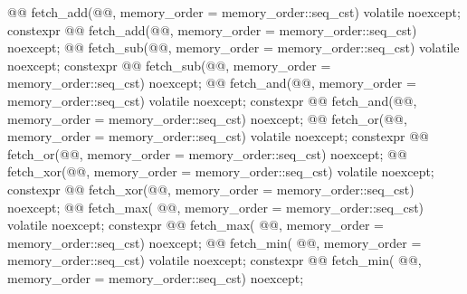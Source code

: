 \begin{codeblock}
{{    @@ fetch_add(@@,
                            memory_order = memory_order::seq_cst) volatile noexcept;
    constexpr @@ fetch_add(@@,
                            memory_order = memory_order::seq_cst) noexcept;
    @@ fetch_sub(@@,
                            memory_order = memory_order::seq_cst) volatile noexcept;
    constexpr @@ fetch_sub(@@,
                            memory_order = memory_order::seq_cst) noexcept;
    @@ fetch_and(@@,
                            memory_order = memory_order::seq_cst) volatile noexcept;
    constexpr @@ fetch_and(@@,
                            memory_order = memory_order::seq_cst) noexcept;
    @@ fetch_or(@@,
                            memory_order = memory_order::seq_cst) volatile noexcept;
    constexpr @@ fetch_or(@@,
                            memory_order = memory_order::seq_cst) noexcept;
    @@ fetch_xor(@@,
                            memory_order = memory_order::seq_cst) volatile noexcept;
    constexpr @@ fetch_xor(@@,
                            memory_order = memory_order::seq_cst) noexcept;
    @@ fetch_max( @@,
                            memory_order = memory_order::seq_cst) volatile noexcept;
    constexpr @@ fetch_max( @@,
                            memory_order = memory_order::seq_cst) noexcept;
    @@ fetch_min( @@,
                            memory_order = memory_order::seq_cst) volatile noexcept;
    constexpr @@ fetch_min( @@,
                            memory_order = memory_order::seq_cst) noexcept;

}}
\end{codeblock}
